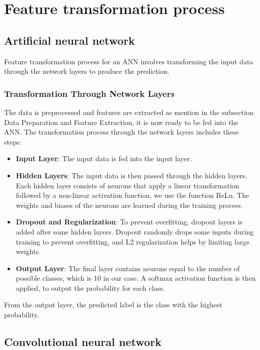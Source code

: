 \section{Feature transformation process}


\subsection{Artificial neural network}

Feature transformation process for an ANN involves transforming the input data through the network layers to produce the prediction.

\subsubsection{Transformation Through Network Layers}
The data is preprocessed and features are extracted as mention in the subsection Data Preparation and Feature Extraction, it is now ready to be fed into the ANN. The transformation process through the network layers includes these steps:
\begin{itemize}
    \item \textbf{Input Layer}: The input data is fed into the input layer.
    \item \textbf{Hidden Layers}: The input data is then passed through the hidden layers. Each hidden layer consists of neurons that apply a linear transformation followed by a non-linear activation function, we use the function ReLu. The weights and biases of the neurons are learned during the training process.
    \item \textbf{Dropout and Regularization}: To prevent overfitting, dropout layers is added after some hidden layers. Dropout randomly drops some inputs during training to prevent overfitting, and L2 regularization helps by limiting large weights.
    \item \textbf{Output Layer}: The final layer contains neurons equal to the number of possible classes, which is 10 in our case. A softmax activation function is then applied, to output the probability for each class.
\end{itemize}
From the output layer, the predicted label is the class with the highest probability.

\subsection{Convolutional neural network}

